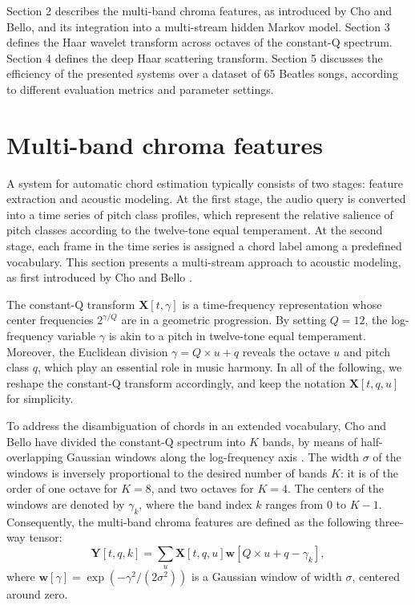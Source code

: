 \documentclass{article}
\begin{document}
Section 2 describes the multi-band chroma features, as
introduced by Cho and Bello, and its integration into a multi-stream
hidden Markov model.
Section 3 defines the Haar wavelet transform across octaves
of the constant-Q spectrum.
Section 4 defines the deep Haar scattering transform.
Section 5 discusses the efficiency of the presented systems over
a dataset of 65 Beatles songs, according to different evaluation
metrics and parameter settings.

\section{Multi-band chroma features}
A system for automatic chord estimation typically consists of two stages:
feature extraction and acoustic modeling.
At the first stage, the audio query is converted into a time series of
pitch class profiles, which represent the relative salience of
pitch classes according to the twelve-tone equal temperament.
At the second stage, each frame in the time series is assigned
a chord label among a predefined vocabulary.
This section presents a multi-stream approach to acoustic modeling,
as first introduced by Cho and Bello \cite{cho2013mirex}.

The constant-Q transform $\boldsymbol{X}[t, \gamma]$ is a time-frequency
representation whose center frequencies $2^{\gamma/Q}$ are in a geometric progression.
By setting $Q=12$, the log-frequency variable $\gamma$ is akin to a pitch in twelve-tone
equal temperament.
Moreover, the Euclidean division $\gamma = Q \times u + q$
reveals the octave $u$ and pitch class $q$,
which play an essential role in music harmony.
In all of the following, we reshape the constant-Q transform
accordingly, and keep the notation $\boldsymbol{X}[t, q, u]$ for simplicity.

To address the disambiguation of chords in an extended vocabulary,
Cho and Bello have divided the constant-Q spectrum into $K$
bands, by means of half-overlapping Gaussian windows along
the log-frequency axis \cite{cho2013mirex}.
The width $\sigma$ of the windows is inversely proportional
to the desired number of bands $K$:
it is of the order of one octave for $K=8$,
and two octaves for $K=4$.
The centers of the windows are denoted by $\gamma_k$, where
the band index $k$ ranges from $0$ to $K-1$.
Consequently, the multi-band chroma features are defined as the following
three-way tensor:
\begin{equation}
\boldsymbol{Y}[t, q, k]
=
\sum_{u} 
\boldsymbol{X}[t, q, u]
\boldsymbol{w}[Q \times u + q - \gamma_k],
\end{equation}
where
$\boldsymbol{w}[\gamma] = \exp( - \gamma^2 / (2\sigma^2))$
is a Gaussian window of width $\sigma$, centered around zero.
\end{document}

